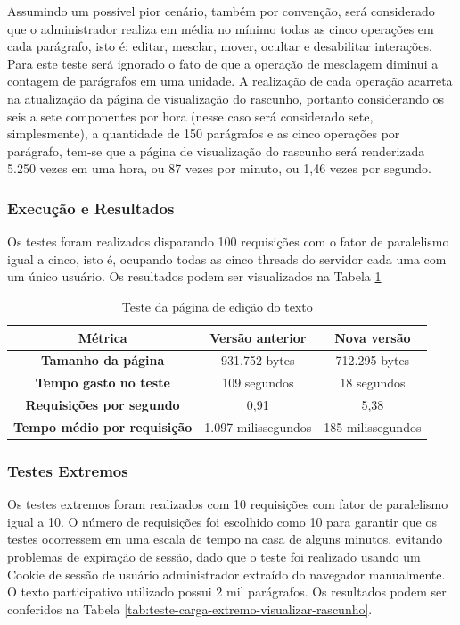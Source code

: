 Assumindo um possível pior cenário, também por convenção, será considerado que o administrador realiza em média no mínimo todas as cinco operações em cada parágrafo, isto é: editar, mesclar, mover, ocultar e desabilitar interações.
Para este teste será ignorado o fato de que a operação de mesclagem diminui a contagem de parágrafos em uma unidade.
A realização de cada operação acarreta na atualização da página de visualização do rascunho, portanto considerando os seis a sete componentes por hora (nesse caso será considerado sete, simplesmente), a quantidade de 150 parágrafos e as cinco operações por parágrafo, tem-se que a página de visualização do rascunho será renderizada 5.250 vezes em uma hora, ou 87 vezes por minuto, ou 1,46 vezes por segundo.

\subsubsection {Execução e Resultados}

Os testes foram realizados disparando 100 requisições com o fator de paralelismo igual a cinco, isto é, ocupando todas as cinco threads do servidor cada uma com um único usuário. Os resultados podem ser visualizados na Tabela \ref{tab:teste-carga-visualizar-rascunho}

\begin{table}[h]
	\centering
	\caption{Teste da página de edição do texto}
	\label{tab:teste-carga-visualizar-rascunho}
	\begin{tabular}{ccc}
		\toprule
		Métrica & Versão anterior & \textbf{Nova versão} \\
		\midrule
    \textbf{Tamanho da página} & 931.752 bytes & 712.295 bytes \\
    \textbf{Tempo gasto no teste} & 109 segundos & 18 segundos \\
    \textbf{Requisições por segundo} & 0,91 & 5,38 \\
    \textbf{Tempo médio por requisição} & 1.097 milissegundos & 185 milissegundos \\
		\bottomrule
	\end{tabular}
\end{table}

\subsubsection {Testes Extremos}

Os testes extremos foram realizados com 10 requisições com fator de paralelismo igual a 10. O número de requisições foi escolhido como 10 para garantir que os testes ocorressem em uma escala de tempo na casa de alguns minutos, evitando problemas de expiração de sessão, dado que o teste foi realizado usando um Cookie de sessão de usuário administrador extraído do navegador manualmente. O texto participativo utilizado possui 2 mil parágrafos. Os resultados podem ser conferidos na Tabela \ref{tab:teste-carga-extremo-visualizar-rascunho}.


